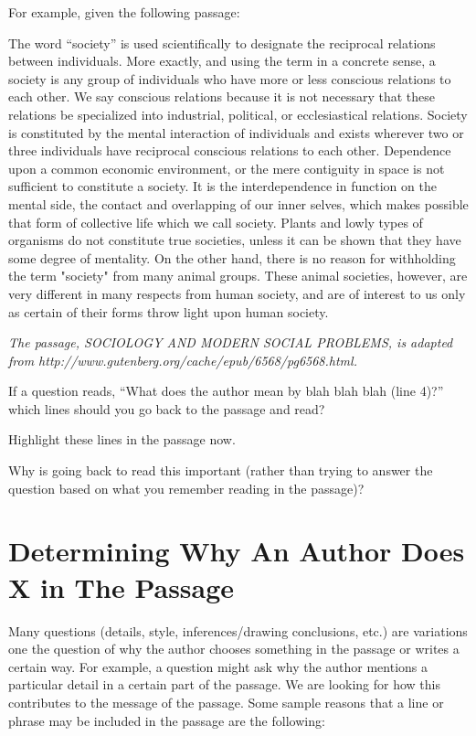 \bigskip
For example, given the following passage:

\begin{linenumbers*}
\modulolinenumbers[5]
The word ``society'' is used scientifically to designate the reciprocal relations between individuals. More exactly, and using the term in a concrete sense, a society is any group of individuals who have more or less conscious relations to each other. We say conscious relations because it is not necessary that these relations be specialized into industrial, political, or ecclesiastical relations. Society is constituted by the mental interaction of individuals and exists wherever two or three individuals have reciprocal conscious relations to each other. Dependence upon a common economic environment, or the mere contiguity in space is not sufficient to constitute a society. It is the interdependence in function on the mental side, the contact and overlapping of our inner selves, which makes possible that form of collective life which we call society. Plants and lowly types of organisms do not constitute true societies, unless it can be shown that they have some degree of mentality. On the other hand, there is no reason for withholding the term "society" from many animal groups. These animal societies, however, are very different in many respects from human society, and are of interest to us only as certain of their forms throw light upon human society.
\end{linenumbers*}
\textit{The passage, SOCIOLOGY AND MODERN SOCIAL PROBLEMS, is adapted from http://www.gutenberg.org/cache/epub/6568/pg6568.html.}

\bigskip
If a question reads, ``What does the author mean by blah blah blah (line 4)?'' which lines should you go back to the passage and read? \hrulefill

\bigskip
Highlight these lines in the passage now. 

\bigskip
Why is going back to read this important (rather than trying to answer the question based on what you remember reading in the passage)? \hrulefill

\bigskip
\section{Determining Why An Author Does X in The Passage}

Many questions (details, style, inferences/drawing conclusions, etc.) are variations one the question of why the author chooses something in the passage or writes a certain way. For example, a question might ask why the author mentions a particular detail in a certain part of the passage. We are looking for how this contributes to the message of the passage. Some sample reasons that a line or phrase may be included in the passage are the following:

